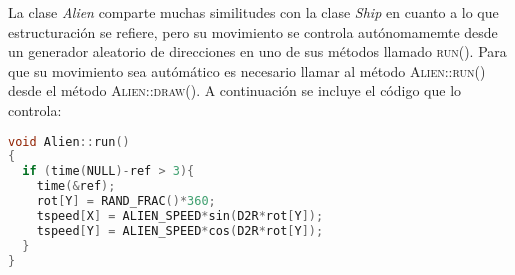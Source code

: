 La clase \emph{Alien} comparte muchas similitudes con la clase \emph{Ship} en cuanto a lo que estructuración se refiere, pero su movimiento se controla autónomamemte desde un generador aleatorio de direcciones en uno de sus métodos llamado \textsc{run()}. Para que su movimiento sea autómático es necesario llamar al método \textsc{Alien::run()} desde el método \textsc{Alien::draw()}. A continuación se incluye el código que lo controla:

\lstset{style=mystyle}
\begin{lstlisting}[language=C++, title=Movimiento errático del \emph{Alien} gracias a la función \textit{run()}, frame=single, numbers=none]
void Alien::run()
{ 
  if (time(NULL)-ref > 3){
    time(&ref);
    rot[Y] = RAND_FRAC()*360;
    tspeed[X] = ALIEN_SPEED*sin(D2R*rot[Y]);
    tspeed[Y] = ALIEN_SPEED*cos(D2R*rot[Y]);
  }
}
\end{lstlisting}
